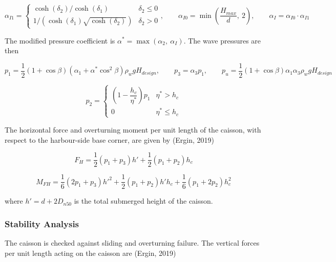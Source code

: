\documentclass[a4paper, 11pt]{article}
\begin{document}
\begin{equation}
    \alpha_{I1} = \begin{cases} \cosh(\delta_2)/\cosh(\delta_1) & \delta_2 \leq 0 \\ 1/\left(\cosh(\delta_1)\sqrt{\cosh(\delta_2)}\right) & \delta_2 > 0 \end{cases}, \qquad \alpha_{I0} = \min\left(\frac{H_{max}}{d},\ 2\right), \qquad \alpha_I = \alpha_{I0}\cdot\alpha_{I1}
\end{equation}

The modified pressure coefficient is $\alpha^* = \max(\alpha_2,\ \alpha_I)$. The wave pressures are then

\begin{equation}
    p_1 = \frac{1}{2}(1+\cos\beta)\left(\alpha_1 + \alpha^*\cos^2\beta\right)\rho_w g H_{design}, \qquad p_3 = \alpha_3 p_1, \qquad p_u = \frac{1}{2}(1+\cos\beta)\alpha_1\alpha_3\rho_w g H_{design}
\end{equation}

\begin{equation}
    p_2 = \begin{cases} \left(1 - \dfrac{h_c}{\eta^*}\right)p_1 & \eta^* > h_c \\ 0 & \eta^* \leq h_c \end{cases}
\end{equation}

The horizontal force and overturning moment per unit length of the caisson, with respect to the harbour-side base corner, are given by (Ergin, 2019)

\begin{equation}
    F_H = \frac{1}{2}(p_1+p_3)h' + \frac{1}{2}(p_1+p_2)h_c
\end{equation}

\begin{equation}
    M_{FH} = \frac{1}{6}(2p_1+p_3)h'^2 + \frac{1}{2}(p_1+p_2)h'h_c + \frac{1}{6}(p_1+2p_2)h_c^2
\end{equation}

where $h' = d + 2D_{n50}$ is the total submerged height of the caisson.

\subsubsection{Stability Analysis}

\hspace*{0.5cm} The caisson is checked against sliding and overturning failure. The vertical forces per unit length acting on the caisson are (Ergin, 2019)
\end{document}
